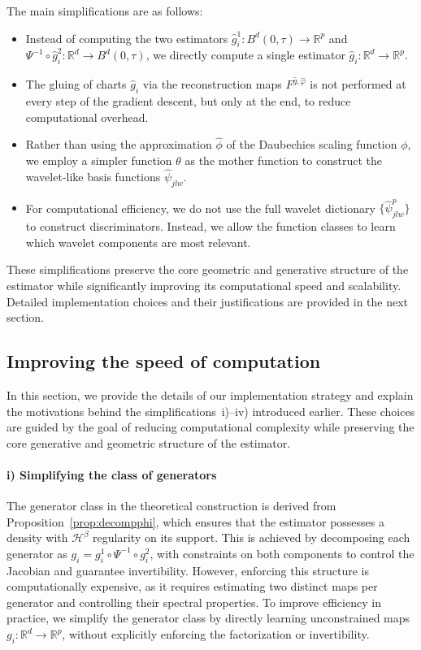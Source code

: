 \documentclass[10pt]{article}
\begin{document}
The main simplifications are as follows:

\begin{itemize}
    \item[i)] Instead of computing the two estimators $\hat{g}_i^1:B^d(0,\tau)\rightarrow \mathbb{R}^p$ and $\Psi^{-1}\circ \hat{g}_i^2:\mathbb{R}^d\rightarrow B^d(0,\tau)$, we directly compute a single estimator $\hat{g}_i:\mathbb{R}^d\rightarrow \mathbb{R}^p$.
    
    \item[ii)] The gluing of charts \( \hat{g}_i \) via the reconstruction maps \( F^{\hat{g}, \hat{\varphi}} \) is not performed at every step of the gradient descent, but only at the end, to reduce computational overhead.
    
    \item[iii)] Rather than using the approximation \( \hat{\phi} \) of the Daubechies scaling function \( \phi \), we employ a simpler function \( \theta \) as the mother function to construct the wavelet-like basis functions \( \hat{\psi}_{jlw} \).
    
    \item[iv)] For computational efficiency, we do not use the full wavelet dictionary \( \{ \hat{\psi}_{jlw}^p \} \) to construct discriminators. Instead, we allow the function classes to learn which wavelet components are most relevant.
\end{itemize}

These simplifications preserve the core geometric and generative structure of the estimator while significantly improving its computational speed and scalability. Detailed implementation choices and their justifications are provided in the next section. 


\subsection{Improving the speed of computation}\label{sec:speedofcomp}
In this section, we provide the details of our implementation strategy and explain the motivations behind the simplifications~i)--iv) introduced earlier. These choices are guided by the goal of reducing computational complexity while preserving the core generative and geometric structure of the estimator.
\paragraph{i) Simplifying the class of generators} The generator class in the theoretical construction is derived from Proposition~\ref{prop:decompphi}, which ensures that the estimator possesses a density with \(\mathcal{H}^\beta\) regularity on its support. This is achieved by decomposing each generator as \( g_i = g_i^1 \circ \Psi^{-1} \circ g_i^2 \), with constraints on both components to control the Jacobian and guarantee invertibility. However, enforcing this structure is computationally expensive, as it requires estimating two distinct maps per generator and controlling their spectral properties. To improve efficiency in practice, we simplify the generator class by directly learning unconstrained maps \( g_i: \mathbb{R}^d \to \mathbb{R}^p \), without explicitly enforcing the factorization or invertibility.
\end{document}
